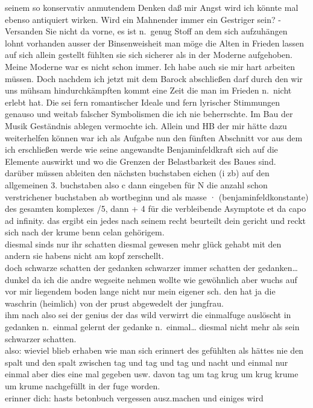 \documentclass[
]{article}
\begin{document}
seinem so konservativ anmutendem Denken daß mir Angst wird ich könnte
mal ebenso antiquiert wirken. Wird ein Mahnender immer ein Gestriger
sein? - Versanden Sie nicht da vorne, es ist n.~genug Stoff an dem sich
aufzuhängen lohnt vorhanden ausser der Binsenweisheit man möge die Alten
in Frieden lassen auf sich allein gestellt fühlten sie sich sicherer als
in der Moderne aufgehoben. Meine Moderne war es nicht schon immer. Ich
habe auch sie mir hart arbeiten müssen. Doch nachdem ich jetzt mit dem
Barock abschließen darf durch den wir uns mühsam hindurchkämpften kommt
eine Zeit die man im Frieden n.~nicht erlebt hat. Die sei fern
romantischer Ideale und fern lyrischer Stimmungen genauso und weitab
falscher Symbolismen die ich nie beherrschte. Im Bau der Musik
Geständnis ablegen vermochte ich. Allein und HB der mir hätte dazu
weiterhelfen können war ich als Aufgabe nun den fünften Abschnitt vor
aus dem ich erschließen werde wie seine angewandte Benjaminfeldkraft
sich auf die Elemente auswirkt und wo die Grenzen der Belastbarkeit des
Baues sind.\\
darüber müssen ableiten den nächsten buchstaben eichen (i zb) auf den
allgemeinen 3. buchstaben also c dann eingeben für N die anzahl schon
verstrichener buchstaben ab wortbeginn und als masse ·
(benjaminfeldkonstante) des gesamten komplexes /5, dann + 4 für die
verbleibende Asymptote et da capo ad infinity. das ergibt ein jedes nach
seinem recht beurteilt dein gericht und reckt sich nach der krume benn
celan gehörigem.\\
diesmal sinds nur ihr schatten diesmal gewesen mehr glück gehabt mit den
andern sie habens nicht am kopf zerschellt.\\
doch schwarze schatten der gedanken schwarzer immer schatten der
gedanken\ldots{} dunkel da ich die andre wegseite nehmen wollte wie
gewöhnlich aber wuchs auf vor mir liegendem boden lange nicht nur mein
eigener sch. den hat ja die waschrin (heimlich) von der prust abgewedelt
der jungfrau.\\
ihm nach also sei der genius der das wild verwirrt die einmalfuge
auslöscht in gedanken n.~einmal gelernt der gedanke n.~einmal\ldots{}
diesmal nicht mehr als sein schwarzer schatten.\\
also: wieviel blieb erhaben wie man sich erinnert des gefühlten als
hättes nie den spalt und den spalt zwischen tag und tag und tag und
nacht und einmal nur einmal aber dies eine mal gegeben usw. davon tag um
tag krug um krug krume um krume nachgefüllt in der fuge worden.\\
erinner dich: hasts betonbuch vergessen ausz.machen und einiges wird
\end{document}
